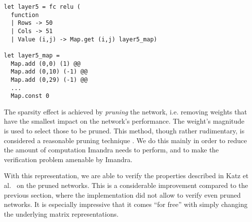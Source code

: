 \documentclass[runningheads]{llncs}
\begin{document}
\begin{lstlisting}[language=caml]
let layer5 = fc relu (
  function
  | Rows -> 50
  | Cols -> 51
  | Value (i,j) -> Map.get (i,j) layer5_map)

let layer5_map =
  Map.add (0,0) (1) @@
  Map.add (0,10) (-1) @@
  Map.add (0,29) (-1) @@
  ...
  Map.const 0
\end{lstlisting}

\noindent The sparsity effect is achieved by \emph{pruning} the network, i.e. removing weights that have the smallest impact on the network's performance. The weight's magnitude is used to select those to be pruned. This method, though rather rudimentary, is considered a reasonable pruning technique \cite{lecun_optimal_1990}.
%
We do this mainly in order to reduce the amount of computation Imandra needs to perform, and to make the verification problem amenable by Imandra.

With this representation, we are able to verify the properties described in Katz et al.~\cite{KaBaDiJuKo17Reluplex} on the pruned networks.
This is a considerable improvement compared to the previous section, where the implementation did not allow to verify even pruned networks. It is especially impressive that it comes ``for free'' with simply changing the underlying matrix representations.
\end{document}
